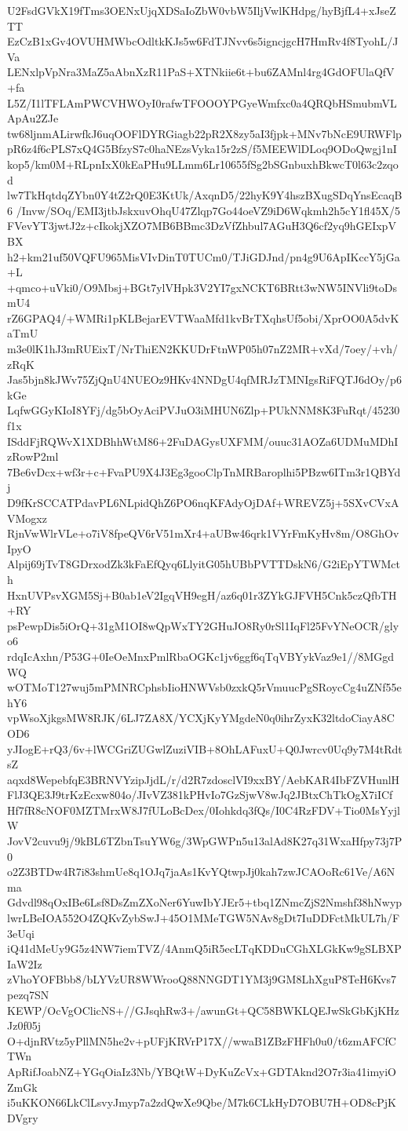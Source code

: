 U2FsdGVkX19fTms3OENxUjqXDSaIoZbW0vbW5IljVwlKHdpg/hyBjfL4+xJseZTT
EzCzB1xGv4OVUHMWbcOdltkKJs5w6FdTJNvv6s5igncjgcH7HmRv4f8TyohL/JVa
LENxlpVpNra3MaZ5aAbnXzR11PaS+XTNkiie6t+bu6ZAMnl4rg4GdOFUlaQfV+fa
L5Z/I1lTFLAmPWCVHWOyI0rafwTFOOOYPGyeWmfxc0a4QRQbHSmubmVLApAu2ZJe
tw68ljnmALirwfkJ6uqOOFlDYRGiagb22pR2X8zy5aI3fjpk+MNv7bNcE9URWFlp
pR6z4f6cPLS7xQ4G5BfzyS7c0haNEzsVyka15r2zS/f5MEEWlDLoq9ODoQwgj1nI
kop5/km0M+RLpnIxX0kEaPHu9LLmm6Lr10655fSg2bSGnbuxhBkwcT0l63c2zqod
lw7TkHqtdqZYbn0Y4tZ2rQ0E3KtUk/AxqnD5/22hyK9Y4hszBXugSDqYnsEcaqB6
/Invw/SOq/EMI3jtbJskxuvOhqU47Zlqp7Go44oeVZ9iD6Wqkmh2h5cY1fl45X/5
FVevYT3jwtJ2z+cIkokjXZO7MB6BBmc3DzVfZhbul7AGuH3Q6cf2yq9hGEIxpVBX
h2+km21uf50VQFU965MisVIvDinT0TUCm0/TJiGDJnd/pn4g9U6ApIKccY5jGa+L
+qmco+uVki0/O9Mbsj+BGt7ylVHpk3V2YI7gxNCKT6BRtt3wNW5INVli9toDsmU4
rZ6GPAQ4/+WMRi1pKLBejarEVTWaaMfd1kvBrTXqhsUf5obi/XprOO0A5dvKaTmU
m3e0lK1hJ3mRUEixT/NrThiEN2KKUDrFtnWP05h07nZ2MR+vXd/7oey/+vh/zRqK
Jas5bjn8kJWv75ZjQnU4NUEOz9HKv4NNDgU4qfMRJzTMNIgsRiFQTJ6dOy/p6kGe
LqfwGGyKIoI8YFj/dg5bOyAciPVJuO3iMHUN6Zlp+PUkNNM8K3FuRqt/45230f1x
ISddFjRQWvX1XDBhhWtM86+2FuDAGysUXFMM/ouuc31AOZa6UDMuMDhIzRowP2ml
7Be6vDcx+wf3r+c+FvaPU9X4J3Eg3gooClpTnMRBaroplhi5PBzw6ITm3r1QBYdj
D9fKrSCCATPdavPL6NLpidQhZ6PO6nqKFAdyOjDAf+WREVZ5j+5SXvCVxAVMogxz
RjnVwWlrVLe+o7iV8fpeQV6rV51mXr4+aUBw46qrk1VYrFmKyHv8m/O8GhOvIpyO
Alpij69jTvT8GDrxodZk3kFaEfQyq6LlyitG05hUBbPVTTDskN6/G2iEpYTWMcth
HxnUVPsvXGM5Sj+B0ab1eV2IgqVH9egH/az6q01r3ZYkGJFVH5Cnk5czQfbTH+RY
psPewpDis5iOrQ+31gM1OI8wQpWxTY2GHuJO8Ry0rSl1IqFl25FvYNeOCR/glyo6
rdqIcAxhn/P53G+0IeOeMnxPmlRbaOGKc1jv6ggf6qTqVBYykVaz9e1//8MGgdWQ
wOTMoT127wuj5mPMNRCphsbIioHNWVsb0zxkQ5rVmuucPgSRoycCg4uZNf55ehY6
vpWsoXjkgsMW8RJK/6LJ7ZA8X/YCXjKyYMgdeN0q0ihrZyxK32ltdoCiayA8COD6
yJIogE+rQ3/6v+lWCGriZUGwlZuziVIB+8OhLAFuxU+Q0Jwrcv0Uq9y7M4tRdtsZ
aqxd8WepebfqE3BRNVYzipJjdL/r/d2R7zdosclVI9xxBY/AebKAR4IbFZVHunlH
FlJ3QE3J9trKzEcxw804o/JIvVZ381kPHvIo7GzSjwV8wJq2JBtxChTkOgX7iICf
Hf7fR8cNOF0MZTMrxW8J7fULoBcDex/0Iohkdq3fQs/I0C4RzFDV+Tio0MsYyjlW
JovV2cuvu9j/9kBL6TZbnTsuYW6g/3WpGWPn5u13alAd8K27q31WxaHfpy73j7P0
o2Z3BTDw4R7i83shmUe8q1OJq7jaAs1KvYQtwpJj0kah7zwJCAOoRc61Ve/A6Nma
Gdvdl98qOxIBe6Lsf8DsZmZXoNer6YuwIbYJEr5+tbq1ZNmcZjS2Nmshf38hNwyp
lwrLBeIOA552O4ZQKvZybSwJ+45O1MMeTGW5NAv8gDt7IuDDFctMkUL7h/F3eUqi
iQ41dMeUy9G5z4NW7iemTVZ/4AnmQ5iR5ecLTqKDDuCGhXLGkKw9gSLBXPIaW2Iz
zVhoYOFBbb8/bLYVzUR8WWrooQ88NNGDT1YM3j9GM8LhXguP8TeH6Kvs7pezq7SN
KEWP/OcVgOClicNS+//GJsqhRw3+/awunGt+QC58BWKLQEJwSkGbKjKHzJz0f05j
O+djnRVtz5yPllMN5he2v+pUFjKRVrP17X//wwaB1ZBzFHFh0u0/t6zmAFCfCTWn
ApRifJoabNZ+YGqOiaIz3Nb/YBQtW+DyKuZcVx+GDTAknd2O7r3ia41imyiOZmGk
i5uKKON66LkClLsvyJmyp7a2zdQwXe9Qbe/M7k6CLkHyD7OBU7H+OD8cPjKDVgry

